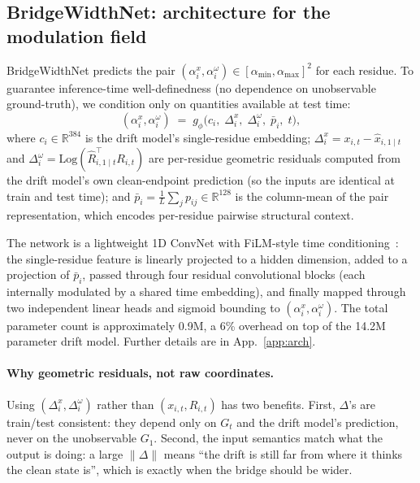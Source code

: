 \documentclass{article}
\theoremstyle{remark}
\theoremstyle{definition}
\newcommand{\R}{\mathbb{R}}
\newcommand{\Log}{\mathrm{Log}}
\begin{document}
\subsection{BridgeWidthNet: architecture for the modulation field}
\label{subsec:bwnet}

BridgeWidthNet predicts the pair $(\alpha^x_i,\alpha^\omega_i)\in
[\alpha_{\min},\alpha_{\max}]^2$ for each residue. To guarantee inference-time
well-definedness (no dependence on unobservable ground-truth), we condition
only on quantities available at test time:
\begin{equation}
(\alpha^x_i,\alpha^\omega_i)\;=\;g_\phi\!\big(
  c_i,\;\Delta^x_i,\;\Delta^\omega_i,\;\bar p_i,\;t
\big),
\label{eq:bwnet-input}
\end{equation}
where $c_i\in\R^{384}$ is the drift model's single-residue embedding;
$\Delta^x_i=x_{i,t}-\hat{x}_{i,1\mid t}$ and
$\Delta^\omega_i=\Log(\hat{R}_{i,1\mid t}^\top R_{i,t})$ are per-residue
geometric residuals computed from the drift model's own clean-endpoint
prediction (so the inputs are identical at train and test time); and
$\bar p_i=\frac{1}{L}\sum_j p_{ij}\in\R^{128}$ is the column-mean of the pair
representation, which encodes per-residue pairwise structural context.

The network is a lightweight 1D ConvNet with FiLM-style time
conditioning~\citep{perez2018film}: the single-residue feature is linearly
projected to a hidden dimension, added to a projection of $\bar p_i$, passed
through four residual convolutional blocks (each internally modulated by a
shared time embedding), and finally mapped through two independent linear
heads and sigmoid bounding to $(\alpha^x_i,\alpha^\omega_i)$. The total
parameter count is approximately 0.9M, a 6\% overhead on top of the 14.2M
parameter drift model. Further details are in App.~\ref{app:arch}.

\paragraph{Why geometric residuals, not raw coordinates.}
Using $(\Delta^x_i,\Delta^\omega_i)$ rather than $(x_{i,t},R_{i,t})$ has two
benefits. First, $\Delta$'s are train/test consistent: they depend only on
$G_t$ and the drift model's prediction, never on the unobservable $G_1$.
Second, the input semantics match what the output is doing: a large
$\|\Delta\|$ means ``the drift is still far from where it thinks the clean
state is'', which is exactly when the bridge should be wider.
\end{document}
